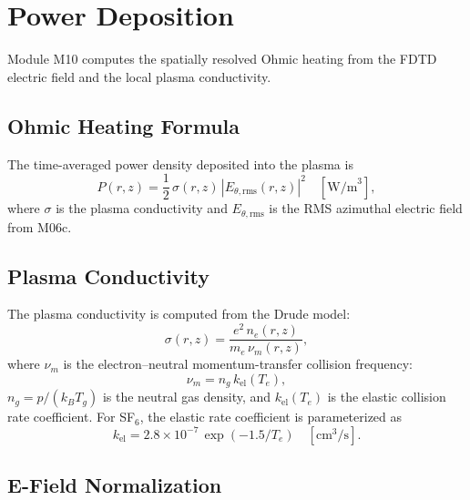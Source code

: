 \documentclass[11pt,a4paper]{report}
\newcommand{\Te}{T_e}
\begin{document}
\section{Power Deposition}
\label{sec:m10}

Module M10 computes the spatially resolved Ohmic heating from the FDTD electric field and the local plasma conductivity.

\subsection{Ohmic Heating Formula}

The time-averaged power density deposited into the plasma is
\begin{equation}
  \boxed{P(r,z) = \frac{1}{2}\,\sigma(r,z)\,|E_{\theta,\mathrm{rms}}(r,z)|^2 \quad [\mathrm{W/m}^3],}
  \label{eq:power-deposition}
\end{equation}
where $\sigma$ is the plasma conductivity and $E_{\theta,\mathrm{rms}}$ is the RMS azimuthal electric field from M06c.

\subsection{Plasma Conductivity}

The plasma conductivity is computed from the Drude model:
\begin{equation}
  \sigma(r,z) = \frac{e^2\,n_e(r,z)}{m_e\,\nu_m(r,z)},
  \label{eq:sigma}
\end{equation}
where $\nu_m$ is the electron--neutral momentum-transfer collision frequency:
\begin{equation}
  \nu_m = n_g\,k_\mathrm{el}(\Te),
  \label{eq:nu-m}
\end{equation}
$n_g = p/(k_B T_g)$ is the neutral gas density, and $k_\mathrm{el}(\Te)$ is the elastic collision rate coefficient.  For SF$_6$, the elastic rate coefficient is parameterized as
\begin{equation}
  k_\mathrm{el} = 2.8 \times 10^{-7}\,\exp(-1.5/\Te) \quad [\mathrm{cm}^3/\mathrm{s}].
\end{equation}

\subsection{E-Field Normalization}
\end{document}
